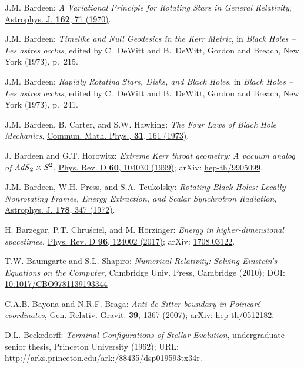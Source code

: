 \begin{thebibliography}{123}
J.M. Bardeen:
{\em A Variational Principle for Rotating Stars in General Relativity},
\href{https://doi.org/10.1086/150635}{Astrophys. J. {\bf  162}, 71 (1970)}.

J.M. Bardeen:
{\em Timelike and Null Geodesics in the Kerr Metric},
in {\em Black Holes -- Les astres occlus},  edited by C.~DeWitt and B.~DeWitt,
Gordon and Breach, New York (1973), p.~215.

J.M. Bardeen:
{\em Rapidly Rotating Stars, Disks, and Black Holes},
in {\em Black Holes -- Les astres occlus},  edited by C.~DeWitt and B.~DeWitt,
Gordon and Breach, New York (1973), p.~241.

J.M. Bardeen, B. Carter, and S.W. Hawking:
{\em The Four Laws of Black Hole Mechanics},
\href{https://doi.org/10.1007/BF01645742}{Commun. Math. Phys., {\bf 31}, 161 (1973)}.

J. Bardeen and G.T. Horowitz:
{\em Extreme Kerr throat geometry: A vacuum analog of ${\it AdS}_2\times{\it S}^2$},
\href{https://doi.org/10.1103/PhysRevD.60.104030}{Phys. Rev. D {\bf 60}, 104030 (1999)};
arXiv: \href{https://arxiv.org/abs/hep-th/9905099}{hep-th/9905099}.

J.M. Bardeen, W.H. Press, and S.A. Teukolsky:
{\em Rotating Black Holes: Locally Nonrotating Frames, Energy Extraction, and Scalar Synchrotron Radiation},
\href{https://doi.org/10.1086/151796}{Astrophys. J. {\bf  178}, 347 (1972)}.

H. Barzegar, P.T. Chruściel, and M. Hörzinger:
{\em Energy in higher-dimensional spacetimes},
\href{https://doi.org/10.1103/PhysRevD.96.124002}{Phys. Rev. D {\bf 96}, 124002 (2017)};
arXiv: \href{https://arxiv.org/abs/1708.03122}{1708.03122}.

T.W. Baumgarte and S.L. Shapiro:
{\em Numerical Relativity: Solving Einstein's Equations on the Computer},
Cambridge Univ. Press, Cambridge (2010);
DOI: \href{https://doi.org/10.1017/CBO9781139193344}{10.1017/CBO9781139193344}

C.A.B. Bayona and N.R.F. Braga:
{\em Anti-de Sitter boundary in Poincaré coordinates},
\href{https://doi.org/10.1007/s10714-007-0446-y}{Gen. Relativ. Gravit. {\bf 39}, 1367 (2007)};
arXiv: \href{https://arxiv.org/abs/hep-th/0512182}{hep-th/0512182}.

D.L. Beckedorff:
{\em Terminal Configurations of Stellar Evolution},
undergraduate senior thesis, Princeton University (1962);
URL: \url{http://arks.princeton.edu/ark:/88435/dsp019593tx34r}.


\end{thebibliography}
